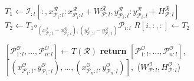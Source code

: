 \begin{algorithm}
\begin{algorithmic}[1]
    \label{alg:line:memcpy_loop}
        \State $T_1 \gets \mathcal{I}_{:l}[:,x^\mathcal{R}_{\mathcal{P}_i:l}:x^\mathcal{R}_{\mathcal{P}_i:l}+W^\mathcal{R}_{\mathcal{P}:l},y^\mathcal{R}_{\mathcal{P}_i:l}:y^\mathcal{R}_{\mathcal{P}_i:l}+H^\mathcal{R}_{\mathcal{P}:l}]$ 
        \State $T_2 \gets T_1 \bm\circ_{(x^\mathcal{I}_{\mathcal{P}_i:l}-x^\mathcal{R}_{\mathcal{P}_i:l}),(y^\mathcal{I}_{\mathcal{P}_i:l}-y^\mathcal{R}_{\mathcal{P}_i:l})} \mathcal{P}_{i:l}$
        \State $R[i,:,:] \gets T_2$
    \EndFor

    \State $[\mathcal{P}^\mathcal{O}_{1:l},...,\mathcal{P}^\mathcal{O}_{n:l}] \gets T(\mathcal{R})$
    \State \textbf{return} $[\mathcal{P}^\mathcal{O}_{1:l},...,\mathcal{P}^\mathcal{O}_{n:l}]$,
    \State \hspace*{5mm} $[(x^\mathcal{O}_{\mathcal{P}_1:l},y^\mathcal{O}_{\mathcal{P}_1:l}),...,(x^\mathcal{O}_{\mathcal{P}_n:l},y^\mathcal{O}_{\mathcal{P}_n:l})],$ ($W^\mathcal{O}_{\mathcal{P}:l},H^\mathcal{O}_{\mathcal{P}:l}$) 
    \EndProcedure
    \end{algorithmic}

    


\end{algorithm}
